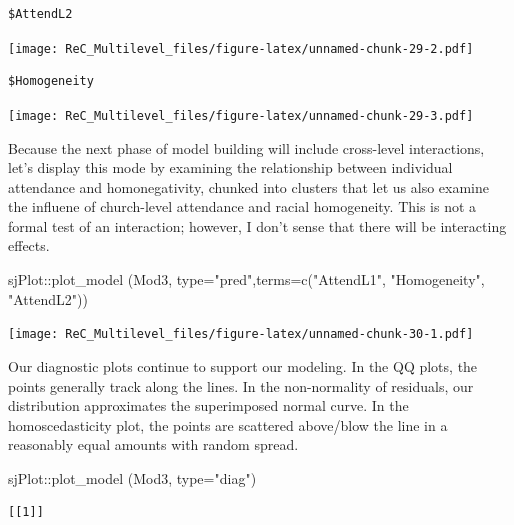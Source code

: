 \documentclass[
  11pt,
]{book}
\newenvironment{Shaded}{\begin{snugshade}}{\end{snugshade}}
\newcommand{\AttributeTok}[1]{\textcolor[rgb]{0.77,0.63,0.00}{#1}}
\newcommand{\FunctionTok}[1]{\textcolor[rgb]{0.00,0.00,0.00}{#1}}
\newcommand{\NormalTok}[1]{#1}
\newcommand{\SpecialCharTok}[1]{\textcolor[rgb]{0.00,0.00,0.00}{#1}}
\newcommand{\StringTok}[1]{\textcolor[rgb]{0.31,0.60,0.02}{#1}}
\begin{document}
\begin{verbatim}
$AttendL2
\end{verbatim}

\texttt{[image: ReC\_Multilevel\_files/figure-latex/unnamed-chunk-29-2.pdf]}

\begin{verbatim}
$Homogeneity
\end{verbatim}

\texttt{[image: ReC\_Multilevel\_files/figure-latex/unnamed-chunk-29-3.pdf]}

Because the next phase of model building will include cross-level interactions, let's display this mode by examining the relationship between individual attendance and homonegativity, chunked into clusters that let us also examine the influene of church-level attendance and racial homogeneity. This is not a formal test of an interaction; however, I don't sense that there will be interacting effects.

\begin{Shaded}
\begin{Highlighting}[]
\NormalTok{sjPlot}\SpecialCharTok{::}\FunctionTok{plot\_model}\NormalTok{ (Mod3, }\AttributeTok{type=}\StringTok{"pred"}\NormalTok{,}\AttributeTok{terms=}\FunctionTok{c}\NormalTok{(}\StringTok{"AttendL1"}\NormalTok{, }\StringTok{"Homogeneity"}\NormalTok{, }\StringTok{"AttendL2"}\NormalTok{))}
\end{Highlighting}
\end{Shaded}

\texttt{[image: ReC\_Multilevel\_files/figure-latex/unnamed-chunk-30-1.pdf]}

Our diagnostic plots continue to support our modeling. In the QQ plots, the points generally track along the lines. In the non-normality of residuals, our distribution approximates the superimposed normal curve. In the homoscedasticity plot, the points are scattered above/blow the line in a reasonably equal amounts with random spread.

\begin{Shaded}
\begin{Highlighting}[]
\NormalTok{sjPlot}\SpecialCharTok{::}\FunctionTok{plot\_model}\NormalTok{ (Mod3, }\AttributeTok{type=}\StringTok{"diag"}\NormalTok{)}
\end{Highlighting}
\end{Shaded}

\begin{verbatim}
[[1]]
\end{verbatim}
\end{document}

